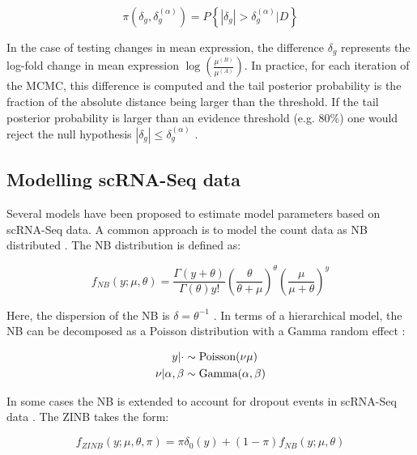\begin{equation}
\pi(\delta_g,\delta_g^{(\alpha)})=P\left\lbrace|\delta_g|>\delta_g^{(\alpha)}|D\right\rbrace
\end{equation}

In the case of testing changes in mean expression, the difference $\delta_g$ represents the log-fold change in mean expression $\log(\frac{\mu^{(B)}}{\mu^{(A)}})$. In practice, for each iteration of the MCMC, this difference is computed and the tail posterior probability is the fraction of the absolute distance being larger than the threshold. If the tail posterior probability is larger than an evidence threshold (e.g. 80\%) one would reject the null hypothesis $|\delta_g|\leq\delta_g^{(\alpha)}$ \citep{Vallejos2016}. 

\subsection{Modelling scRNA-Seq data}

Several models have been proposed to estimate model parameters based on scRNA-Seq data. A common approach is to model the count data as \gls{NB} distributed \citep{Vallejos2015BASiCS, Risso2018, Lopez2018}. The NB distribution is defined as:

\begin{equation}
f_{NB}(y;\mu,\theta)=\frac{\Gamma(y+\theta)}{\Gamma(\theta)y!}\left(\frac{\theta}{\theta + \mu}\right)^\theta\left(\frac{\mu}{\mu + \theta}\right)^y
\end{equation}

Here, the dispersion of the NB is $\delta=\theta^{-1}$ \cite{Risso2018}. In terms of a hierarchical model, the NB can be decomposed as a Poisson distribution with a Gamma random effect \cite{Vallejos2015BASiCS}:

\begin{align*}
y|\cdot&\sim{}\textnormal{Poisson}(\nu\mu)\\
\nu|\alpha,\beta&\sim{}\textnormal{Gamma}(\alpha,\beta)
\end{align*}

In some cases \citep{Risso2018, Lopez2018} the NB is extended to account for dropout events in scRNA-Seq data \citep{Kharchenko2015}. The \gls{ZINB} takes the form:

\begin{equation}
f_{ZINB}(y;\mu,\theta,\pi)=\pi\delta_0(y) + (1-\pi)f_{NB}(y;\mu,\theta) 
\end{equation}

